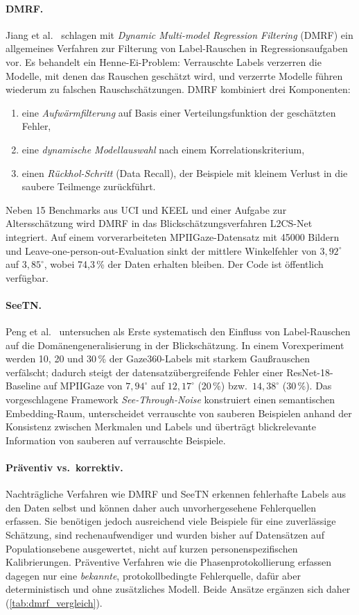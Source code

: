 \documentclass[
  11pt,
  a4paper,
  oneside,
  DIV=12,                 %
  BCOR=8mm,               %
  parskip=half,           %
  headings=normal,
  bibliography=totoc,     %
  listof=totoc            %
]{scrreprt}
\begin{document}
\paragraph{DMRF.}
Jiang et al.~\cite{jiang2026dmrf} schlagen mit \emph{Dynamic Multi-model Regression Filtering} (DMRF) ein allgemeines Verfahren zur Filterung von Label-Rauschen in Regressionsaufgaben vor. Es behandelt ein Henne-Ei-Problem: Verrauschte Labels verzerren die Modelle, mit denen das Rauschen geschätzt wird, und verzerrte Modelle führen wiederum zu falschen Rauschschätzungen. DMRF kombiniert drei Komponenten:
\begin{enumerate}
  \item eine \emph{Aufwärmfilterung} auf Basis einer Verteilungsfunktion der geschätzten Fehler,
  \item eine \emph{dynamische Modellauswahl} nach einem Korrelationskriterium,
  \item einen \emph{Rückhol-Schritt} (Data Recall), der Beispiele mit kleinem Verlust in die saubere Teilmenge zurückführt.
\end{enumerate}
Neben 15 Benchmarks aus UCI und KEEL und einer Aufgabe zur Altersschätzung wird DMRF in das Blickschätzungsverfahren L2CS-Net integriert. Auf einem vorverarbeiteten MPIIGaze-Datensatz mit \num{45000} Bildern und Leave-one-person-out-Evaluation sinkt der mittlere Winkelfehler von $3,92^\circ$ auf $3,85^\circ$, wobei 74,3\,\% der Daten erhalten bleiben. Der Code ist öffentlich verfügbar.

\paragraph{SeeTN.}
Peng et al.~\cite{peng2026seetn} untersuchen als Erste systematisch den Einfluss von Label-Rauschen auf die Domänengeneralisierung in der Blickschätzung. In einem Vorexperiment werden 10, 20 und 30\,\% der Gaze360-Labels mit starkem Gaußrauschen verfälscht; dadurch steigt der datensatzübergreifende Fehler einer ResNet-18-Baseline auf MPIIGaze von $7,94^\circ$ auf $12,17^\circ$ (20\,\%) bzw.\ $14,38^\circ$ (30\,\%). Das vorgeschlagene Framework \emph{See-Through-Noise} konstruiert einen semantischen Embedding-Raum, unterscheidet verrauschte von sauberen Beispielen anhand der Konsistenz zwischen Merkmalen und Labels und überträgt blickrelevante Information von sauberen auf verrauschte Beispiele.

\paragraph{Präventiv vs.\ korrektiv.}
Nachträgliche Verfahren wie DMRF und SeeTN erkennen fehlerhafte Labels aus den Daten selbst und können daher auch unvorhergesehene Fehlerquellen erfassen. Sie benötigen jedoch ausreichend viele Beispiele für eine zuverlässige Schätzung, sind rechenaufwendiger und wurden bisher auf Datensätzen auf Populationsebene ausgewertet, nicht auf kurzen personenspezifischen Kalibrierungen. Präventive Verfahren wie die Phasenprotokollierung erfassen dagegen nur eine \emph{bekannte}, protokollbedingte Fehlerquelle, dafür aber deterministisch und ohne zusätzliches Modell. Beide Ansätze ergänzen sich daher (\cref{tab:dmrf_vergleich}).
\end{document}
